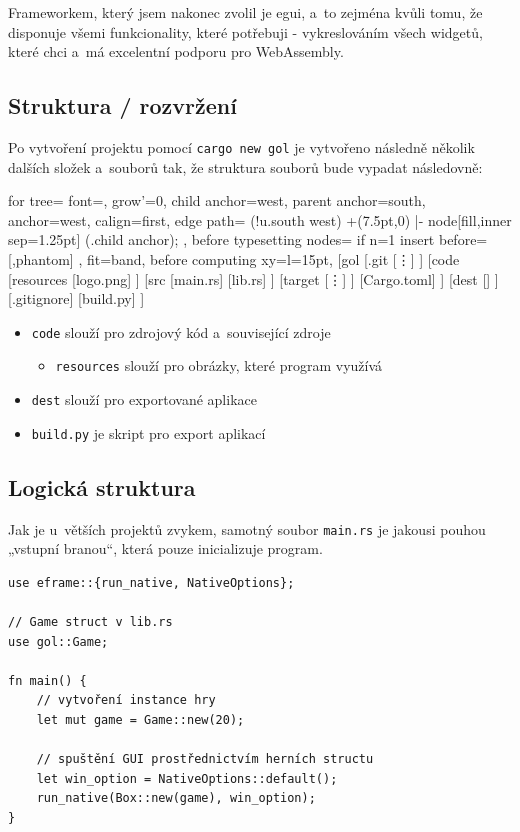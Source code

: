 \documentclass[a4paper, 12pt, twoside]{article} %
\begin{document}
		Frameworkem, který jsem nakonec zvolil je egui, a~to zejména kvůli tomu, že disponuje všemi funkcionality, které potřebuji - vykreslováním všech widgetů, které chci a~má excelentní podporu pro WebAssembly.\cite{egui}
	
	\subsection{Struktura / rozvržení}
		Po vytvoření projektu pomocí \texttt{cargo new gol} je vytvořeno následně několik dalších složek a~souborů tak, že struktura souborů bude vypadat následovně:
		\begin{center}
		\begin{forest}
			for tree={
			font=\ttfamily,
			grow'=0,
			child anchor=west,
			parent anchor=south,
			anchor=west,
			calign=first,
			edge path={
				\noexpand{}
				(!u.south west) +(7.5pt,0) |- node[fill,inner sep=1.25pt] {} (.child anchor);
			},
			before typesetting nodes={
				if n=1
				{insert before={[,phantom]}}
				{}
			},
			fit=band,
			before computing xy={l=15pt},
			}
		[gol
			[.git
			[\vdots]
			]
			[code
			[resources
				[logo.png]
			]
			[src
				[main.rs]
				[lib.rs]
			]
			[target
				[\vdots]
			]
			[Cargo.toml]
			]
			[dest
			[]
			]
			[.gitignore]
			[build.py]
		]
		\end{forest}
		\end{center}

		\begin{itemize}
			\item \texttt{code} slouží pro zdrojový kód a~související zdroje
			\begin{itemize}
				\item \texttt{resources} slouží pro obrázky, které program využívá
			\end{itemize}
			\item \texttt{dest} slouží pro exportované aplikace
			\item \texttt{build.py} je skript pro export aplikací
		\end{itemize}
		
	\subsection{Logická struktura}
		Jak je u~větších projektů zvykem, samotný soubor \texttt{main.rs} je jakousi pouhou „vstupní branou“, která pouze inicializuje program. 
		
		\begin{verbatim}
use eframe::{run_native, NativeOptions};

// Game struct v lib.rs
use gol::Game;

fn main() {
	// vytvoření instance hry
	let mut game = Game::new(20);

	// spuštění GUI prostřednictvím herních structu
	let win_option = NativeOptions::default();
	run_native(Box::new(game), win_option);
}
		\end{verbatim}
		
\end{document}
